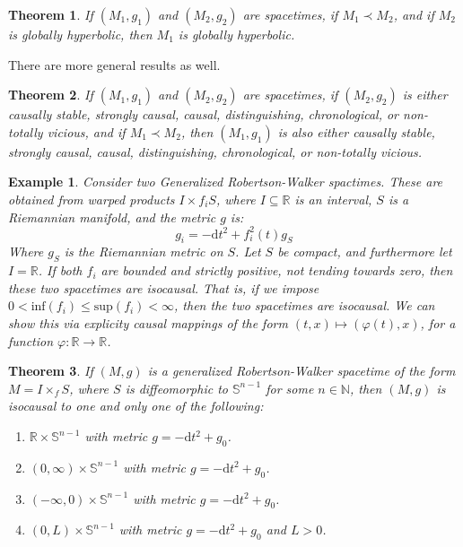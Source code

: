 \documentclass{article}
\theoremstyle{plain}
\newtheorem{theorem}{Theorem}[section]
\theoremstyle{thmit}
\theoremstyle{normal}
\newtheorem{example}{Example}[section]
\begin{document}
        \begin{theorem}
            If $(M_{1},g_{1})$ and $(M_{2},g_{2})$ are spacetimes, if
            $M_{1}\prec{M}_{2}$, and if $M_{2}$ is globally hyperbolic, then
            $M_{1}$ is globally hyperbolic.
        \end{theorem}
        There are more general results as well.
        \begin{theorem}
            If $(M_{1},g_{1})$ and $(M_{2},g_{2})$ are spacetimes, if
            $(M_{2},g_{2})$ is either causally stable, strongly causal, causal,
            distinguishing, chronological, or non-totally vicious, and if
            $M_{1}\prec{M}_{2}$, then $(M_{1},g_{1})$ is also either
            causally stable, strongly causal, causal,
            distinguishing, chronological, or non-totally vicious.
        \end{theorem}
        \begin{example}
            Consider two Generalized Robertson-Walker spactimes. These are
            obtained from warped products $I\times{f}_{i}S$, where
            $I\subseteq\mathbb{R}$ is an interval, $S$ is a Riemannian manifold,
            and the metric $g$ is:
            \begin{equation}
                g_{i}=-\textrm{d}t^{2}+f_{i}^{2}(t)g_{S}
            \end{equation}
            Where $g_{S}$ is the Riemannian metric on $S$. Let $S$ be compact,
            and furthermore let $I=\mathbb{R}$. If both $f_{i}$ are bounded and
            strictly positive, not tending towards zero, then these two
            spacetimes are isocausal. That is, if we impose
            $0<\textrm{inf}(f_{i})\leq\textrm{sup}(f_{i})<\infty$, then
            the two spacetimes are isocausal. We can show this via explicity
            causal mappings of the form
            $(t,x)\mapsto(\varphi(t),x)$, for a function
            $\varphi:\mathbb{R}\rightarrow\mathbb{R}$.
        \end{example}
        \begin{theorem}
            If $(M,g)$ is a generalized Robertson-Walker spacetime of the
            form $M=I\times_{f}S$, where $S$ is diffeomorphic to
            $\mathbb{S}^{n-1}$ for some $n\in\mathbb{N}$, then
            $(M,g)$ is isocausal to one and only one of the following:
            \begin{enumerate}
                \item $\mathbb{R}\times\mathbb{S}^{n-1}$ with metric
                      $g=-\textrm{d}t^{2}+g_{0}$.
                \item $(0,\infty)\times\mathbb{S}^{n-1}$ with metric
                      $g=-\textrm{d}t^{2}+g_{0}$.
                      \item $(-\infty,0)\times\mathbb{S}^{n-1}$ with metric
                      $g=-\textrm{d}t^{2}+g_{0}$.
                      \item $(0,L)\times\mathbb{S}^{n-1}$ with metric
                      $g=-\textrm{d}t^{2}+g_{0}$ and $L>0$.
            \end{enumerate}
        \end{theorem}
\end{document}
